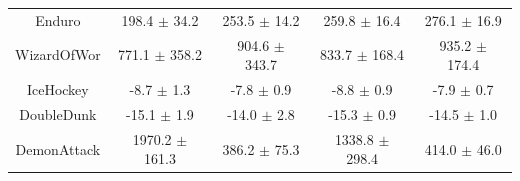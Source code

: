 \begin{table}[h]
\begin{tabular}{ccccc}
Enduro        &      198.4 $\pm$ 34.2 &      253.5 $\pm$ 14.2 &      259.8 $\pm$ 16.4 &      276.1 $\pm$ 16.9 \\
WizardOfWor   &     771.1 $\pm$ 358.2 &     904.6 $\pm$ 343.7 &     833.7 $\pm$ 168.4 &     935.2 $\pm$ 174.4 \\
IceHockey     &        -8.7 $\pm$ 1.3 &        -7.8 $\pm$ 0.9 &        -8.8 $\pm$ 0.9 &        -7.9 $\pm$ 0.7 \\
DoubleDunk    &       -15.1 $\pm$ 1.9 &       -14.0 $\pm$ 2.8 &       -15.3 $\pm$ 0.9 &       -14.5 $\pm$ 1.0 \\
DemonAttack   &    1970.2 $\pm$ 161.3 &      386.2 $\pm$ 75.3 &    1338.8 $\pm$ 298.4 &      414.0 $\pm$ 46.0 \\
\bottomrule
\end{tabular}
\end{table}



